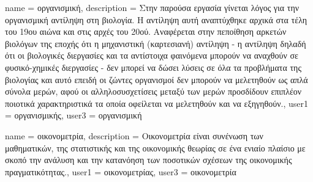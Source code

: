 	{name			= {οργανισμική},
	 description	= {Στην παρούσα εργασία γίνεται λόγος για την οργανισμική αντίληψη στη βιολογία. Η αντίληψη αυτή αναπτύχθηκε αρχικά στα τέλη του 19ου αιώνα και στις αρχές του 20ού. Αναφέρεται στην πεποίθηση αρκετών βιολόγων της εποχής ότι η μηχανιστική (καρτεσιανή) αντίληψη - η αντίληψη δηλαδή ότι οι βιολογικές διεργασίες και τα αντίστοιχα φαινόμενα μπορούν να αναχθούν σε φυσικό-χημικές διεργασίες - δεν μπορεί να δώσει λύσεις σε όλα τα προβλήματα της βιολογίας και αυτό επειδή οι ζώντες οργανισμοί δεν μπορούν να μελετηθούν ως απλά σύνολα μερών, αφού οι αλληλοσυσχετίσεις μεταξύ των μερών προσδίδουν επιπλέον ποιοτικά χαρακτηριστικά τα οποία οφείλεται να μελετηθούν και να εξηγηθούν.},
	 user1			= {οργανισμικής},
	 user3			= {οργανισμική}
	}
	
	{name			= {οικονομετρία},
	 description	= {Οικονομετρία είναι συνένωση των μαθηματικών, της στατιστικής και της οικονομικής θεωρίας σε ένα ενιαίο πλαίσιο με σκοπό την ανάλυση και την κατανόηση των ποσοτικών σχέσεων της οικονομικής πραγματικότητας.},
	 user1			= {οικονομετρίας},
	 user3			= {οικονομετρία}
	}